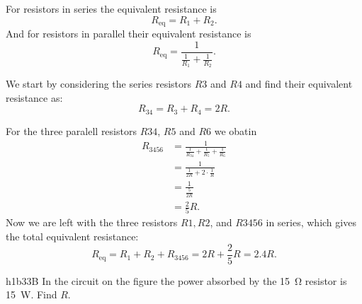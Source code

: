   {\color{AUred}
  \begin{derivation}
    For resistors in series the equivalent resistance is
    \begin{equation*}
      R_{\mathrm{eq}} = R_1 + R_2
    .\end{equation*}
    And for resistors in parallel their equivalent resistance is
    \begin{equation*}
      R_{\mathrm{eq}} = \frac{1}{\frac{1}{R_1} + \frac{1}{R_2}}
    .\end{equation*}
    
    We start by considering the series resistors $R3$ and $R4$ and find their equivalent resistance as:
    \begin{equation*}
      R_{34} = R_3 + R_4 = 2R
    .\end{equation*}

    For the three paralell resistors $R34$, $R5$ and $R6$ we obatin
    \begin{align*}
      R_{3456} &= \frac{1}{\frac{1}{R_{34}} + \frac{1}{R_{5}} + \frac{1}{R_6}} \\
               &= \frac{1}{\frac{1}{2R} + 2 \cdot \frac{1}{R}} \\
               &= \frac{1}{\frac{5}{2R}} \\
               &= \frac{2}{5} R
    .\end{align*}
    Now we are left with the three resistors $R1, R2$, and $R3456$ in series, which gives the total equivalent resistance:
    \begin{equation*}
      R_{\mathrm{eq}} = R_1 + R_2 + R_{3456} = 2R + \frac{2}{5} R = \num{2,4} R
    .\end{equation*}
  \end{derivation}
}

  

  \begin{problemwithimage}{h1b3}{3B}
    In the circuit on the figure the power absorbed by the \qty{15}{\ohm} resistor is \qty{15}{\W}. Find $R$.
  \end{problemwithimage}

